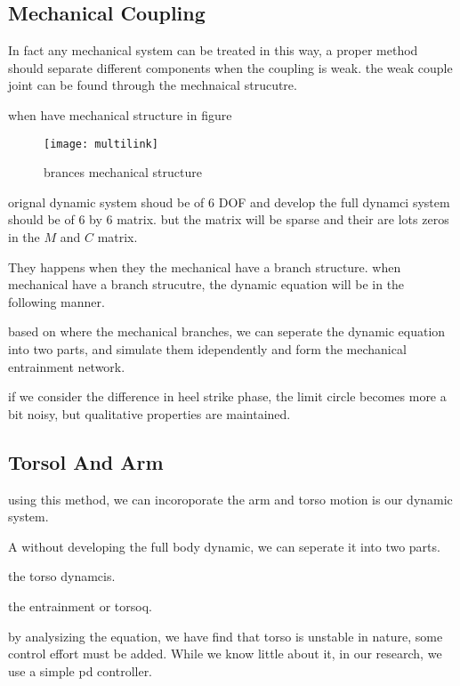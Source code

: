 \subsection*{Mechanical Coupling}
In fact any mechanical system can be treated in this way,
a proper method should separate different components when the coupling is weak.
the weak couple joint can be found through the mechnaical strucutre.

when have mechanical structure in figure
\begin{figure}[!htbp]
  \begin{center}
      \texttt{[image: multilink]}
    \caption{brances mechanical structure}
    \label{fig:branches structure}
\end{center}
\end{figure}

orignal dynamic system shoud be of 6 DOF and develop the full dynamci system should be of 6 by 6 matrix.
but the matrix will be sparse and their are lots zeros in the $M$ and $C$ matrix.






They happens when they the mechanical have a branch structure.
when mechanical have a branch strucutre,
the dynamic equation will be in the following manner.


based on where the mechanical branches, we can seperate the dynamic equation into two parts,
and simulate them idependently and form the mechanical entrainment network.


if we consider the difference in heel strike phase,
the limit circle becomes more a bit noisy, but qualitative properties are maintained.



\subsection*{Torsol And Arm}
using this method, we can incoroporate the arm and torso motion is our dynamic system.

A without developing the full body dynamic, we can seperate it into two parts.

the torso dynamcis.

the entrainment or torsoq.


by analysizing the equation,
we have find that torso is unstable in nature,
some control effort must be added.
While we know little about it,
in our research, we use a simple pd controller.


